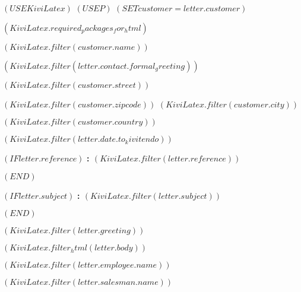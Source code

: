 $( USE KiviLatex )$
$( USE P )$
$( SET customer = letter.customer )$

$( KiviLatex.required_packages_for_html )$

\newcommand{\lxlangcode}{$(template_meta.language.template_code)$}
\newcommand{\lxmedia}{$(template_meta.media)$}
\newcommand{\lxcurrency}{}
\newcommand{\lxtitlebar}{}



\ourhead{}{}{}{}{}



\fontsize{10pt}{12pt}\selectfont

\vspace*{1cm}

\begin{minipage}{14cm}

  $( KiviLatex.filter(customer.name) )$

  $( KiviLatex.filter(letter.contact.formal_greeting) )$

  $( KiviLatex.filter(customer.street) )$

  $( KiviLatex.filter(customer.zipcode) )$ $( KiviLatex.filter(customer.city) )$

  $( KiviLatex.filter(customer.country) )$

\end{minipage}

\vspace{2.5cm}
\hfill $( KiviLatex.filter(letter.date.to_kivitendo) )$

$( IF letter.reference )$
\textbf{\ihrzeichen : $( KiviLatex.filter(letter.reference) )$}

\vspace{1cm}
$( END )$

$( IF letter.subject )$
\textbf{\betreff : $( KiviLatex.filter(letter.subject) )$}

\vspace{1cm}
$( END )$

$( KiviLatex.filter(letter.greeting) )$

\vspace{0.5cm}

$( KiviLatex.filter_html(letter.body) )$

\vspace{0.5cm}

\begin{minipage}{6cm}

\textbf{$( KiviLatex.filter(letter.employee.name) )$}

\end{minipage}
\begin{minipage}{6cm}

\textbf{$( KiviLatex.filter(letter.salesman.name) )$}

\end{minipage}


